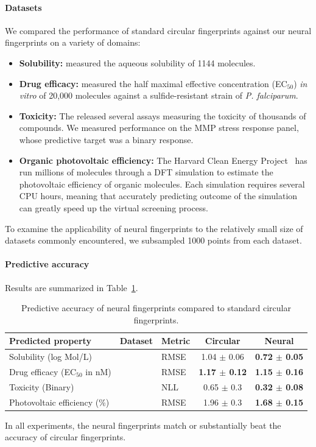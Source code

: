 \documentclass{article}
\begin{document}
\paragraph{Datasets}
We compared the performance of standard circular fingerprints against our neural fingerprints on a variety of domains:
%
\begin{itemize}
\item {\bf Solubility:} \cite{delaney_data_2004} measured the aqueous solubility of 1144 molecules.
\item{\bf Drug efficacy:} \citet{gamo2010thousands} measured the half maximal effective concentration (EC$_{50}$) {\it in vitro} of 20,000 molecules against a sulfide-resistant strain of {\it P. falciparum}.
\item {\bf Toxicity:} The \citet{tox21} released several assays measuring the toxicity of thousands of compounds.
We measured performance on the MMP stress response panel, whose predictive target was a binary response.
\item {\bf Organic photovoltaic efficiency:} The Harvard Clean Energy Project~\citet{hachmann2011harvard} has run millions of molecules through a DFT simulation to estimate the photovoltaic efficiency of organic molecules.
Each simulation requires several CPU hours, meaning that accurately predicting outcome of the simulation can greatly speed up the virtual screening process.
\end{itemize}
%
To examine the applicability of neural fingerprints to the relatively small size of datasets commonly encountered, we subsampled 1000 points from each dataset.

\paragraph{Predictive accuracy}
Results are summarized in Table~\ref{table:main results}.
%
\begin{table}
\begin{tabular}{lll|cc}
Predicted property              & Dataset                     & Metric & Circular        & Neural   \\
\midrule
Solubility (log Mol/L)          & \citet{delaney_data_2004}   &   RMSE & 1.04 $\pm$ 0.06 & \bf{0.72} $\pm$ 0.05 \\
Drug efficacy (EC$_{50}$ in nM) & \citet{gamo2010thousands}   &   RMSE & \bf{1.17} $\pm$ 0.12 & \bf{1.15} $\pm$ 0.16 \\
Toxicity (Binary)               & \citet{tox21}               &   NLL  & 0.65 $\pm$ 0.3  & \bf{0.32} $\pm$ 0.08 \\
Photovoltaic efficiency (\%)    & \citet{hachmann2011harvard} &  RMSE  & 1.96 $\pm$ 0.3  & \bf{1.68} $\pm$ 0.15
\end{tabular}
\label{table:main results}
\caption{Predictive accuracy of neural fingerprints compared to standard circular fingerprints.}
\end{table}
%
In all experiments, the neural fingerprints match or substantially beat the accuracy of circular fingerprints.
\end{document}
